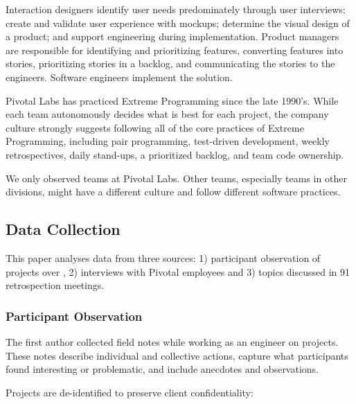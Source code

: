 Interaction designers identify user needs predominately through user interviews; create and validate user experience with mockups; determine the visual design of a product; and support engineering during implementation. Product managers are responsible for identifying and prioritizing features, converting features into stories, prioritizing stories in a backlog, and communicating the stories to the engineers. Software engineers implement the solution. 

Pivotal Labs has practiced Extreme Programming \cite{BeckExtremeProgramming2004} since the late 1990's. While each team autonomously decides what is best for each project, the company culture strongly suggests following all of the core practices of Extreme Programming, including pair programming, test-driven development, weekly retrospectives, daily stand-ups, a prioritized backlog, and team code ownership. 

We only observed teams at Pivotal Labs. Other teams, especially teams in other divisions, might have a different culture and follow different software practices.

\subsection{Data Collection}
This paper analyses data from three sources: 1) participant observation of \numberOfObservedProjects{} projects over \durationOfResearchStudyPlural{}, 2) interviews with Pivotal employees and 3) topics discussed in 91 retrospection meetings. 
\subsubsection{Participant Observation}
The first author collected field notes while working as an engineer on \numberOfObservedProjects{} projects. These notes describe individual and collective actions, capture what participants found interesting or problematic, and include anecdotes and observations.

Projects are de-identified to preserve client confidentiality:

